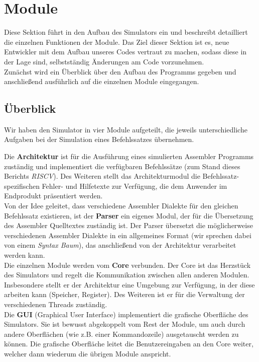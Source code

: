 
\section{Module}

Diese Sektion führt in den Aufbau des Simulators ein und beschreibt detailliert
die einzelnen Funktionen der Module. Das Ziel dieser Sektion ist es, neue
Entwickler mit dem Aufbau unseres Codes vertraut zu machen, sodass diese in der
Lage sind, selbstständig Änderungen am Code vorzunehmen. \\
Zunächst wird ein Überblick über den Aufbau des Programms gegeben und
anschließend ausführlich auf die einzelnen Module eingegangen.

\subsection{Überblick}

Wir haben den Simulator in vier Module aufgeteilt, die jeweils unterschiedliche
Aufgaben bei der Simulation eines Befehlssatzes übernehmen.

Die \textbf{Architektur} ist für die Ausführung eines simulierten Assembler
Programms zuständig und implementiert die verfügbaren Befehlssätze (zum Stand
dieses Berichts \textit{RISCV}). Des Weiteren stellt das Architekturmodul
die Befehlssatz-spezifischen Fehler- und Hilfetexte zur Verfügung, die dem
Anwender im Endprodukt präsentiert werden. \\
Von der Idee geleitet, dass verschiedene Assembler Dialekte für den gleichen
Befehlssatz existieren, ist der \textbf{Parser} ein eigenes Modul, der für die
Übersetzung des Assembler Quelltextes zuständig ist. Der Parser übersetzt die
möglicherweise verschiedenen Assembler Dialekte in ein allgemeines Format (wir
sprechen dabei von einem \textit{Syntax Baum}), das anschließend von der Architektur
verarbeitet werden kann. \\
Die einzelnen Module werden vom \textbf{Core} verbunden. Der Core ist das
Herzstück des Simulators und regelt die Kommunikation zwischen allen anderen
Modulen. Insbesondere stellt er der Architektur eine Umgebung zur Verfügung, in
der diese arbeiten kann (Speicher, Register). Des Weiteren ist er für die
Verwaltung der verschiedenen Threads zuständig. \\
Die \textbf{GUI} (Graphical User Interface) implementiert die grafische
Oberfläche des Simulators. Sie ist bewusst abgekoppelt vom Rest der Module,
um auch durch andere Oberflächen (wie z.B. einer Kommandozeile) ausgetauscht
werden zu können. Die grafische Oberfläche leitet die Benutzereingaben an den
Core weiter, welcher dann wiederum die übrigen Module anspricht.

